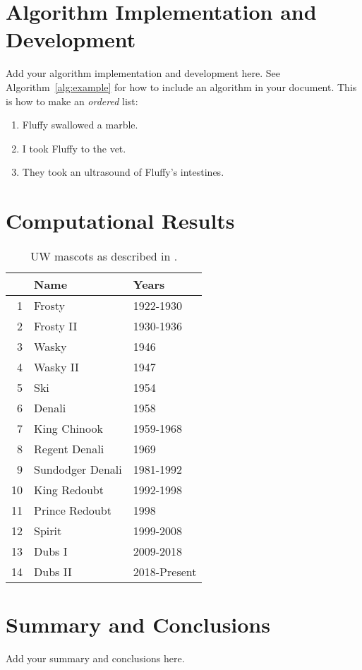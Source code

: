 \documentclass{artikel3}
\begin{document}
\section{Algorithm Implementation and Development}
Add your algorithm implementation and development here. See Algorithm~\ref{alg:example} for how to include an algorithm in your document. This is how to make an \textit{ordered} list:
\begin{enumerate}
    \item Fluffy swallowed a marble.
    \item I took Fluffy to the vet.
    \item They took an ultrasound of Fluffy's intestines.
\end{enumerate}

\section{Computational Results}
\begin{table}
    \centering
    \begin{tabular}{rll}
           & Name             & Years        \\
        \hline
        1  & Frosty           & 1922-1930    \\
        2  & Frosty II        & 1930-1936    \\
        3  & Wasky            & 1946         \\
        4  & Wasky II         & 1947         \\
        5  & Ski              & 1954         \\
        6  & Denali           & 1958         \\
        7  & King Chinook     & 1959-1968    \\
        8  & Regent Denali    & 1969         \\
        9  & Sundodger Denali & 1981-1992    \\
        10 & King Redoubt     & 1992-1998    \\
        11 & Prince Redoubt   & 1998         \\
        12 & Spirit           & 1999-2008    \\
        13 & Dubs I           & 2009-2018    \\
        14 & Dubs II          & 2018-Present
    \end{tabular}
    \caption{UW mascots as described in \cite{washington_huskies}.}
    \label{tab:mascots}
\end{table}


\section{Summary and Conclusions}
Add your summary and conclusions here.
\end{document}
